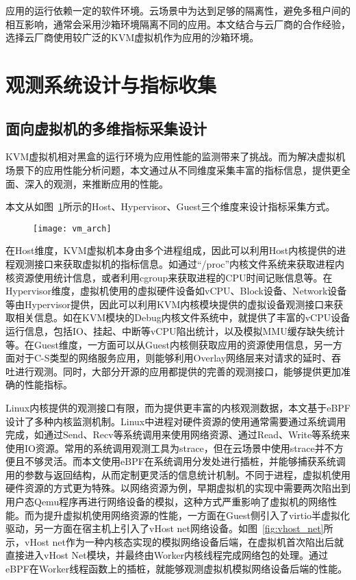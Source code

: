 应用的运行依赖一定的软件环境。云场景中为达到足够的隔离性，避免多租户间的相互影响，通常会采用沙箱环境隔离不同的应用。本文结合与云厂商的合作经验，选择云厂商使用较广泛的KVM虚拟机作为应用的沙箱环境。

\section{观测系统设计与指标收集}

\subsection{面向虚拟机的多维指标采集设计}


KVM虚拟机相对黑盒的运行环境为应用性能的监测带来了挑战。而为解决虚拟机场景下的应用性能分析问题，本文通过从不同维度采集丰富的指标信息，提供更全面、深入的观测，来推断应用的性能。

本文从如图~\ref{fig:vm_arch}所示的Host、Hypervisor、Guest三个维度来设计指标采集方式。

\begin{figure}[!htbp]
    \centering
    \texttt{[image: vm\_arch]}
    \label{fig:vm_arch}
\end{figure}

在Host维度，KVM虚拟机本身由多个进程组成，因此可以利用Host内核提供的进程观测接口来获取虚拟机的指标信息。如通过“/proc”内核文件系统来获取进程内核资源使用统计信息，或者利用cgroup来获取进程的CPU时间记账信息等。在Hypervisor维度，虚拟机使用的虚拟硬件设备如vCPU、Block设备、Network设备等由Hypervisor提供，因此可以利用KVM内核模块提供的虚拟设备观测接口来获取相关信息。如在KVM模块的Debug内核文件系统中，就提供了丰富的vCPU设备运行信息，包括IO、挂起、中断等vCPU陷出统计，以及模拟MMU缓存缺失统计等。在Guest维度，一方面可以从Guest内核侧获取应用的资源使用信息，另一方面对于C-S类型的网络服务应用，则能够利用Overlay网络层来对请求的延时、吞吐进行观测。同时，大部分开源的应用都提供的完善的观测接口，能够提供更加准确的性能指标。

Linux内核提供的观测接口有限，而为提供更丰富的内核观测数据，本文基于eBPF设计了多种内核监测机制。Linux中进程对硬件资源的使用通常需要通过系统调用完成，如通过Send、Recv等系统调用来使用网络资源、通过Read、Write等系统来使用IO资源。常用的系统调用观测工具为strace，但在云场景中使用strace并不方便且不够灵活。而本文使用eBPF在系统调用分发处进行插桩，并能够捕获系统调用的参数与返回结构，从而定制更灵活的信息统计机制。不同于进程，虚拟机使用硬件资源的方式更为特殊。以网络资源为例，早期虚拟机的实现中需要两次陷出到用户态Qemu程序再进行网络设备的模拟，这种方式严重影响了虚拟机的网络性能。而为提升虚拟机使用网络资源的性能，一方面在Guest侧引入了virtio半虚拟化驱动，另一方面在宿主机上引入了vHost net网络设备。如图~\ref{fig:vhost_net}所示，vHost net作为一种内核态实现的模拟网络设备后端，在虚拟机首次陷出后就直接进入vHost Net模块，并最终由Worker内核线程完成网络包的处理。通过eBPF在Worker线程函数上的插桩，就能够观测虚拟机模拟网络设备后端的性能。

